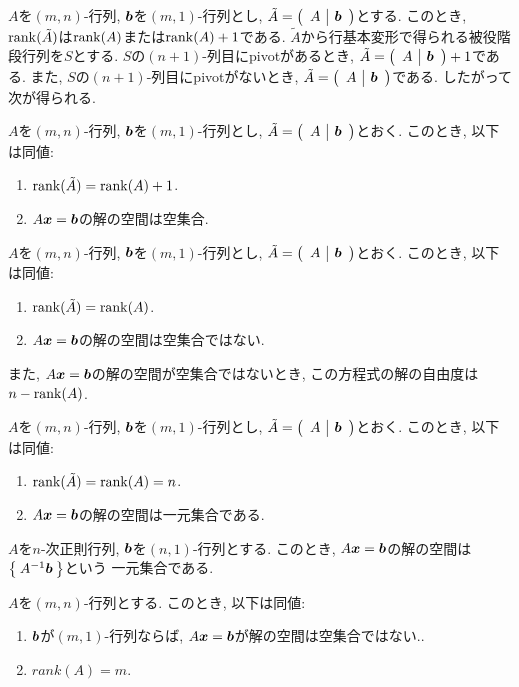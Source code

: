 $A$を$(m,n)$-行列, $\boldsymbol{b}$を$(m,1)$-行列とし,
$\tilde A=\left(\begin{array}{c|c}A& \boldsymbol{b}\end{array}\right)$とする.
このとき,
$\operatorname{rank}(\tilde A)$は$\operatorname{rank}(A)$または$\operatorname{rank}(A)+1$である.
$\tilde A$から行基本変形で得られる被役階段行列を$S$とする.
$S$の$(n+1)$-列目にpivotがあるとき,
$\tilde A=\left(\begin{array}{c|c}A& \boldsymbol{b}\end{array}\right)+1$である.
また,
$S$の$(n+1)$-列目にpivotがないとき,
$\tilde A=\left(\begin{array}{c|c}A& \boldsymbol{b}\end{array}\right)$である.
したがって次が得られる.
\begin{theorem}
  $A$を$(m,n)$-行列, $\boldsymbol{b}$を$(m,1)$-行列とし,
  $\tilde A=\left(\begin{array}{c|c}A& \boldsymbol{b}\end{array}\right)$とおく.
  このとき, 以下は同値:
  \begin{enumerate}
  \item $\operatorname{rank}(\tilde A)=\operatorname{rank}(A)+1$.
  \item $A\boldsymbol{x}=\boldsymbol{b}$の解の空間は空集合.
  \end{enumerate} 
\end{theorem}
\begin{theorem}
  $A$を$(m,n)$-行列, $\boldsymbol{b}$を$(m,1)$-行列とし,
  $\tilde A=\left(\begin{array}{c|c}A& \boldsymbol{b}\end{array}\right)$とおく.
  このとき, 以下は同値:
  \begin{enumerate}
  \item $\operatorname{rank}(\tilde A)=\operatorname{rank}(A)$.
  \item $A\boldsymbol{x}=\boldsymbol{b}$の解の空間は空集合ではない.
  \end{enumerate}
  また,
  $A\boldsymbol{x}=\boldsymbol{b}$の解の空間が空集合ではないとき,
  この方程式の解の自由度は$n-\operatorname{rank}(A)$.
\end{theorem}

\begin{cor}
  $A$を$(m,n)$-行列, $\boldsymbol{b}$を$(m,1)$-行列とし,
  $\tilde A=\left(\begin{array}{c|c}A& \boldsymbol{b}\end{array}\right)$とおく.
  このとき, 以下は同値:
  \begin{enumerate}
  \item $\operatorname{rank}(\tilde A)=\operatorname{rank}(A)=n$.
  \item $A\boldsymbol{x}=\boldsymbol{b}$の解の空間は一元集合である.
  \end{enumerate}
\end{cor}


\begin{cor}
  $A$を$n$-次正則行列, $\boldsymbol{b}$を$(n,1)$-行列とする.
  このとき, $A\boldsymbol{x}=\boldsymbol{b}$の解の空間は$\Set{A^{-1}\boldsymbol{b}}$という
  一元集合である.
\end{cor}

\begin{prop}
  $A$を$(m,n)$-行列とする.
  このとき, 以下は同値:
  \begin{enumerate}
  \item
    \label{thm:equation:surj:suj}
    $\boldsymbol{b}$が$(m,1)$-行列ならば,
    $A\boldsymbol{x}=\boldsymbol{b}$が解の空間は空集合ではない..
  \item
    \label{thm:equation:surj:rank}
    $rank(A)=m$.
  \end{enumerate}  
\end{prop}



